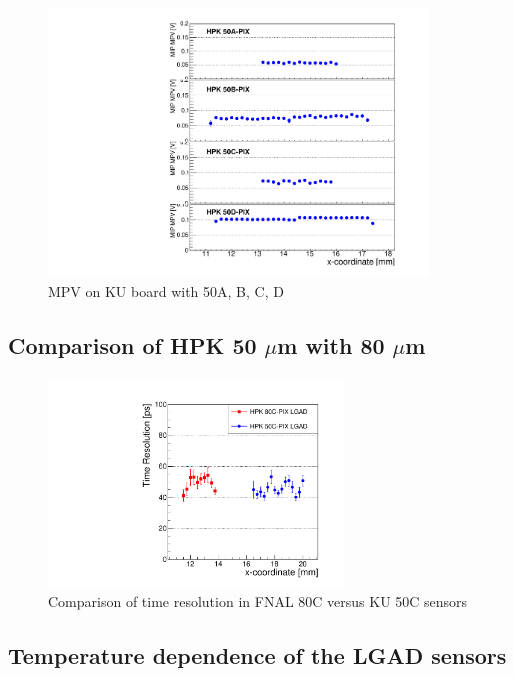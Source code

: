 \documentclass[preprint,1p]{elsarticle}
\begin{document}
\begin{figure}[htbp] 
\centering
\includegraphics[width=0.9\textwidth]{figs/KUBoard_HPK50ABCD/KUBoard_50ABCD_MPV.pdf} 
\caption{MPV on KU board with 50A, B, C, D } 
\label{fig:Sensors} 
\end{figure} 



\subsection{Comparison of HPK 50 $\mu$m with 80 $\mu$m}

\begin{figure}[htbp] 
\centering
\includegraphics[width=0.7\textwidth]{figs/FNAL_TimeResolution_vs_X_HPK50CVs80C.pdf} 
\caption{Comparison of time resolution in FNAL 80C versus KU 50C sensors } 
\label{fig:Sensors} 
\end{figure} 


\subsection{Temperature dependence of the LGAD sensors}
\end{document}
